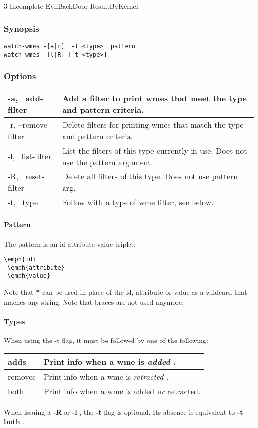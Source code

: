 \subsection{}
\label{watch-wmes}
 3 Incomplete EvilBackDoor ResultByKernel
\subsubsection*{Synopsis}
\begin{verbatim}
watch-wmes -[a|r]  -t <type>  pattern
watch-wmes -[l|R] [-t <type>]
\end{verbatim}
\subsubsection*{Options}
\begin{tabular}{|l|l|}
\hline 
 -a, --add-filter  & Add a filter to print wmes that meet the type and pattern criteria.  \\
 \hline 
 -r, --remove-filter  & Delete filters for printing wmes that match the type and pattern criteria.  \\
 \hline 
 -l, --list-filter  & List the filters of this type currently in use. Does not use the pattern argument.  \\
 \hline 
 -R, --reset-filter  & Delete all filters of this type. Does not use pattern arg.  \\
 \hline 
 -t, --type  & Follow with a type of wme filter, see below.  \\
 \hline 
\end{tabular}
\paragraph*{Pattern}
 The pattern is an id-attribute-value triplet: \begin{verbatim}
\emph{id}
 \emph{attribute}
 \emph{value}
\end{verbatim}
 Note that \textbf{*}
 can be used in place of the id, attribute or value as a wildcard that maches any string. Note that braces are not used anymore. 
\paragraph*{Types}
 When using the -t flag, it must be followed by one of the following: 
\begin{tabular}{|l|l|}
\hline 
 adds  & Print info when a wme is \emph{added}
.  \\
 \hline 
 removes  & Print info when a wme is \emph{retracted}
.  \\
 \hline 
 both  & Print info when a wme is added \emph{or}
 retracted.  \\
 \hline 
\end{tabular}
 When issuing a \textbf{-R}
 or \textbf{-l}
, the \textbf{-t}
 flag is optional. Its absence is equivalent to \textbf{-t both}
. 
